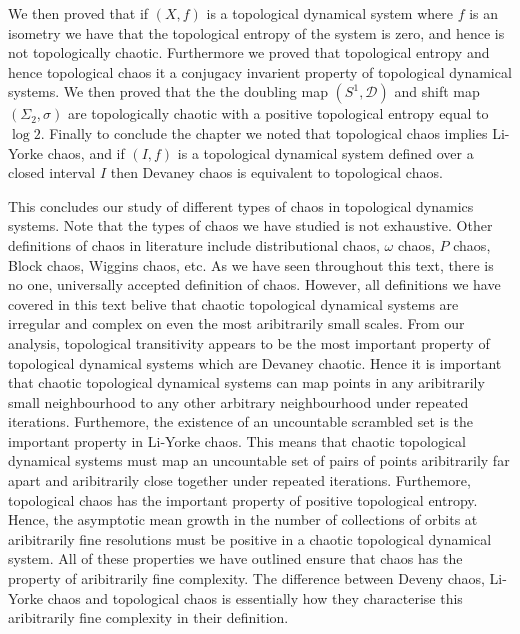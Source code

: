 We then proved that if $(X, f)$ is a topological dynamical system where $f$ is an isometry we have that the topological entropy of the system is zero, and hence is not topologically chaotic. Furthermore we proved that topological entropy and hence topological chaos it a conjugacy invarient property of topological dynamical systems. We then proved that the the doubling map $(S^1, \mathcal{D})$ and shift map $(\Sigma_2, \sigma)$ are topologically chaotic with a positive topological entropy equal to $\log 2$. Finally to conclude the chapter we noted that topological chaos implies Li-Yorke chaos, and if $(I, f)$ is a topological dynamical system defined over a closed interval $I$ then Devaney chaos is equivalent to topological chaos.

This concludes our study of different types of chaos in topological dynamics systems. Note that the types of chaos we have studied is not exhaustive. Other definitions of chaos in literature include distributional chaos, $\omega$ chaos, $P$ chaos, Block chaos, Wiggins chaos, etc. As we have seen throughout this text, there is no one,  universally accepted definition of chaos. However, all definitions we have covered in this text belive that chaotic topological dynamical systems are irregular and complex on even the most aribitrarily small scales. From our analysis, topological transitivity appears to be the most important property of topological dynamical systems which are Devaney chaotic. Hence it is important that chaotic topological dynamical systems can map points in any aribitrarily small neighbourhood to any other arbitrary neighbourhood under repeated iterations. Furthemore, the existence of an uncountable scrambled set is the important property in Li-Yorke chaos. This means that chaotic topological dynamical systems must map an uncountable set of pairs of points aribitrarily far apart and aribitrarily close together under repeated iterations. Furthemore, topological chaos has the important property of positive topological entropy. Hence, the asymptotic mean growth in the number of collections of orbits at aribitrarily fine resolutions must be positive in a chaotic topological dynamical system. All of these properties we have outlined ensure that chaos has the property of aribitrarily fine complexity. The difference between Deveny chaos, Li-Yorke chaos and topological chaos is essentially how they characterise this aribitrarily fine complexity in their definition.
